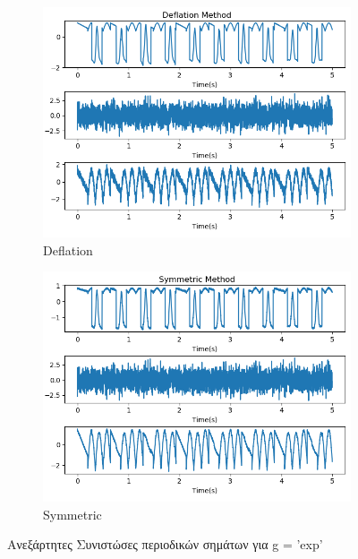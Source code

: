 \begin{figure}[H]
    \centering
    \begin{subfigure}{0.48 \textwidth}
        \centering
       \includegraphics[width=\textwidth]{fwto/exp_def.png} \en
        \caption{Deflation} \gr
        \label{fig:5.9a}
    \end{subfigure}
    \hfill
    \begin{subfigure}{0.48 \textwidth}
        \centering
       \includegraphics[width=\textwidth]{fwto/exp_sym.png}
        \en
        \caption{Symmetric} \gr
        \label{fig:5.9b}
    \end{subfigure}
    \gr
    \caption{Ανεξάρτητες Συνιστώσες περιοδικών σημάτων για \en g = 'exp' \gr}
\end{figure}
